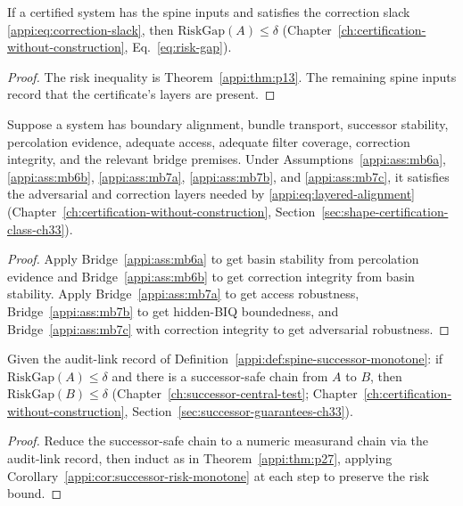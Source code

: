 \begin{theorem}
\label{appi:thm:p30}
If a certified system has the spine inputs and satisfies the correction slack \eqref{appi:eq:correction-slack}, then \(\mathrm{RiskGap}(A)\leq\delta\) (Chapter~\ref{ch:certification-without-construction}, Eq.~\eqref{eq:risk-gap}).
\end{theorem}
\begin{proof}
The risk inequality is Theorem~\ref{appi:thm:p13}. The remaining spine inputs record that the certificate's layers are present.
\end{proof}

\begin{corollary}
\label{appi:cor:bridge-layered-certification}
Suppose a system has boundary alignment, bundle transport, successor stability, percolation evidence, adequate access, adequate filter coverage, correction integrity, and the relevant bridge premises. Under Assumptions~\ref{appi:ass:mb6a}, \ref{appi:ass:mb6b}, \ref{appi:ass:mb7a}, \ref{appi:ass:mb7b}, and \ref{appi:ass:mb7c}, it satisfies the adversarial and correction layers needed by \eqref{appi:eq:layered-alignment} (Chapter~\ref{ch:certification-without-construction}, Section~\ref{sec:shape-certification-class-ch33}).
\end{corollary}
\begin{proof}
Apply Bridge~\ref{appi:ass:mb6a} to get basin stability from percolation evidence and Bridge~\ref{appi:ass:mb6b} to get correction integrity from basin stability. Apply Bridge~\ref{appi:ass:mb7a} to get access robustness, Bridge~\ref{appi:ass:mb7b} to get hidden-BIQ boundedness, and Bridge~\ref{appi:ass:mb7c} with correction integrity to get adversarial robustness.
\end{proof}

\begin{corollary}
\label{appi:cor:successor-chain-risk}
Given the audit-link record of Definition~\ref{appi:def:spine-successor-monotone}: if \(\mathrm{RiskGap}(A)\leq\delta\) and there is a successor-safe chain from \(A\) to \(B\), then \(\mathrm{RiskGap}(B)\leq\delta\) (Chapter~\ref{ch:successor-central-test}; Chapter~\ref{ch:certification-without-construction}, Section~\ref{sec:successor-guarantees-ch33}).
\end{corollary}
\begin{proof}
Reduce the successor-safe chain to a numeric measurand chain via the audit-link record, then induct as in Theorem~\ref{appi:thm:p27}, applying Corollary~\ref{appi:cor:successor-risk-monotone} at each step to preserve the risk bound.
\end{proof}

